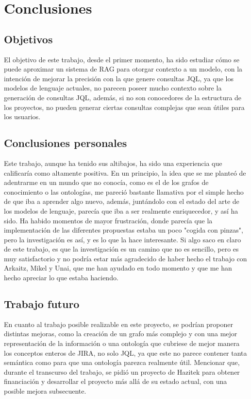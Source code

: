 \section{Conclusiones}
\subsection{Objetivos}
El objetivo de este trabajo, desde el primer momento, ha sido estudiar cómo se puede aproximar un sistema de RAG para otorgar contexto a un modelo, con la intención de mejorar la precisión con la que genere consultas JQL, ya que los modelos de lenguaje actuales, no parecen poseer mucho contexto sobre la generación de consultas JQL, además, si no son conocedores de la estructura de los proyectos, no pueden generar ciertas consultas complejas que sean útiles para los usuarios.

\subsection{Conclusiones personales}
Este trabajo, aunque ha tenido sus altibajos, ha sido una experiencia que calificaría como altamente positiva. En un principio, la idea que se me planteó de adentrarme en un mundo que no conocía, como es el de los grafos de conocimiento o las ontologías, me pareció bastante llamativa por el simple hecho de que iba a aprender algo nuevo, además, juntándolo con el estado del arte de los modelos de lenguaje, parecía que iba a ser realmente enriquecedor, y así ha sido. Ha habido momentos de mayor frustración, donde parecía que la implementación de las diferentes propuestas estaba un poco "cogida con pinzas", pero la investigación es así, y es lo que la hace interesante. Si algo saco en claro de este trabajo, es que la investigación es un camino que no es sencillo, pero es muy satisfactorio y no podría estar más agradecido de haber hecho el trabajo con Arkaitz, Mikel y Unai, que me han ayudado en todo momento y que me han hecho apreciar lo que estaba haciendo.

\subsection{Trabajo futuro}
En cuanto al trabajo posible realizable en este proyecto, se podrían proponer distintas mejoras, como la creación de un grafo más complejo y con una mejor representación de la información o una ontología que cubriese de mejor manera los conceptos enteros de JIRA, no solo JQL, ya que este no parece contener tanta semántica como para que una ontología parezca realmente útil. Mencionar que, durante el transcurso del trabajo, se pidió un proyecto de Hazitek para obtener financiación y desarrollar el proyecto más allá de su estado actual, con una posible mejora subsecuente.